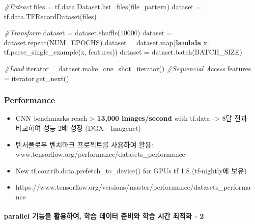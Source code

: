\documentclass[11pt]{article}
\newenvironment{Shaded}{}{}
\newcommand{\KeywordTok}[1]{\textcolor[rgb]{0.00,0.44,0.13}{\textbf{{#1}}}}
\newcommand{\DecValTok}[1]{\textcolor[rgb]{0.25,0.63,0.44}{{#1}}}
\newcommand{\CommentTok}[1]{\textcolor[rgb]{0.38,0.63,0.69}{\textit{{#1}}}}
\newcommand{\NormalTok}[1]{{#1}}
\newcommand{\OperatorTok}[1]{\textcolor[rgb]{0.40,0.40,0.40}{{#1}}}
\newcommand{\BuiltInTok}[1]{{#1}}
\begin{document}
\begin{Shaded}
\begin{Highlighting}[]
\CommentTok{#Extract}
\NormalTok{files }\OperatorTok{=}\NormalTok{ tf.data.Dataset.list_files(file_pattern)}
\NormalTok{dataset }\OperatorTok{=}\NormalTok{ tf.data.TFRecordDataset(files)}

\CommentTok{#Transform}
\NormalTok{dataset }\OperatorTok{=}\NormalTok{ dataset.shuffle(}\DecValTok{10000}\NormalTok{)}
\NormalTok{dataset }\OperatorTok{=}\NormalTok{ dataset.repeat(NUM_EPOCHS)}
\NormalTok{dataset }\OperatorTok{=}\NormalTok{ dataset.}\BuiltInTok{map}\NormalTok{(}\KeywordTok{lambda}\NormalTok{ x: tf.parse_single_example(x, features))}
\NormalTok{dataset }\OperatorTok{=}\NormalTok{ dataset.batch(BATCH_SIZE)}

\CommentTok{#Load}
\NormalTok{iterator }\OperatorTok{=}\NormalTok{ dataset.make_one_shot_iterator() }\CommentTok{#Sequencial Access}
\NormalTok{features }\OperatorTok{=}\NormalTok{ iterator.get_next()}
\end{Highlighting}
\end{Shaded}

    \hypertarget{performance}{%
\subsubsection{Performance}\label{performance}}

\begin{itemize}
\item
  CNN benchmarks reach \textgreater{} \textbf{13,000 images/second} with
  tf.data -\textgreater{} 8달 전과 비교하여 성능 2배 성장 (DGX -
  Imagenet) 
\item
  텐서플로우 벤치마크 프로젝트를 사용하여 활용:
  www.tensorflow.org/performance/datasets\_performance
\item
  New tf.contrib.data.prefetch\_to\_device() for GPUs tf 1.8
  (tf-nightly에 보유)
\item
  https://www.tensorflow.org/versions/master/performance/datasets\_performance
\end{itemize}

\hypertarget{parallel-uxae30uxb2a5uxc744-uxd65cuxc6a9uxd558uxc5ec-uxd559uxc2b5-uxb370uxc774uxd130-uxc900uxbe44uxc640-uxd559uxc2b5-uxc2dcuxac04-uxcd5cuxc801uxd654---2}{%
\paragraph{parallel 기능을 활용하여, 학습 데이터 준비와 학습 시간 최적화
-
2}\label{parallel-uxae30uxb2a5uxc744-uxd65cuxc6a9uxd558uxc5ec-uxd559uxc2b5-uxb370uxc774uxd130-uxc900uxbe44uxc640-uxd559uxc2b5-uxc2dcuxac04-uxcd5cuxc801uxd654---2}}
\end{document}

